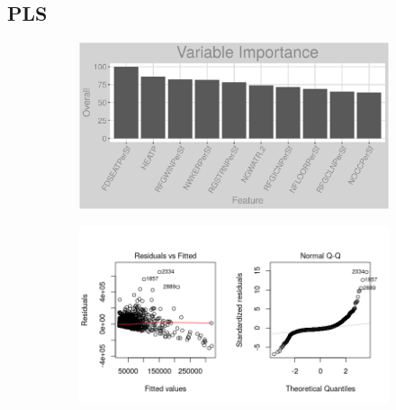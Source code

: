 \subsection{PLS}
\label{appendix:natural_gas:pls}
\begin{figure}[h]
\centering
\begin{subfigure}{1\textwidth}
\centering
\includegraphics[width=.99\textwidth, height=0.35\textheight]{Images/natural_gas_psf_pls_vars.png}
\end{subfigure}
\begin{subfigure}{1\textwidth}
\centering
\includegraphics[width=.99\textwidth, height=0.4\textheight]{Images/natural_gas_psf_pls_res_1.png}
\end{subfigure}
\end{figure}
\FloatBarrier
\newpage
